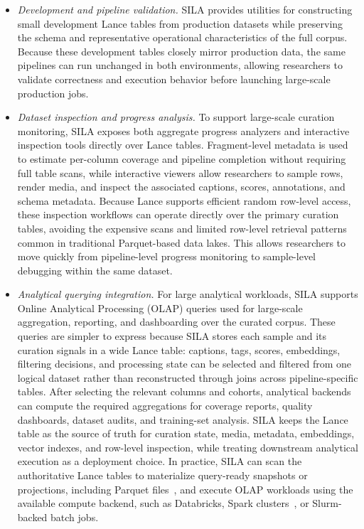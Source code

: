 \documentclass{llmxive}
\begin{document}
\begin{itemize}

\item \textit{Development and pipeline validation.}
SILA provides utilities for constructing small development Lance tables from production datasets while preserving the schema and representative operational characteristics of the full corpus. Because these development tables closely mirror production data, the same pipelines can run unchanged in both environments, allowing researchers to validate correctness and execution behavior before launching large-scale production jobs.

\item \textit{Dataset inspection and progress analysis.}
To support large-scale curation monitoring, SILA exposes both aggregate progress analyzers and interactive inspection tools directly over Lance tables. Fragment-level metadata is used to estimate per-column coverage and pipeline completion without requiring full table scans, while interactive viewers allow researchers to sample rows, render media, and inspect the associated captions, scores, annotations, and schema metadata. Because Lance supports efficient random row-level access, these inspection workflows can operate directly over the primary curation tables, avoiding the expensive scans and limited row-level retrieval patterns common in traditional Parquet-based data lakes. This allows researchers to move quickly from pipeline-level progress monitoring to sample-level debugging within the same dataset.

\item \textit{Analytical querying integration.}
For large analytical workloads, SILA supports Online Analytical Processing (OLAP) queries used for large-scale aggregation, reporting, and dashboarding over the curated corpus. These queries are simpler to express because SILA stores each sample and its curation signals in a wide Lance table: captions, tags, scores, embeddings, filtering decisions, and processing state can be selected and filtered from one logical dataset rather than reconstructed through joins across pipeline-specific tables. After selecting the relevant columns and cohorts, analytical backends can compute the required aggregations for coverage reports, quality dashboards, dataset audits, and training-set analysis. SILA keeps the Lance table as the source of truth for curation state, media, metadata, embeddings, vector indexes, and row-level inspection, while treating downstream analytical execution as a deployment choice. In practice, SILA can scan the authoritative Lance tables to materialize query-ready snapshots or projections, including Parquet files~\citep{parquet2013}, and execute OLAP workloads using the available compute backend, such as Databricks, Spark clusters~\citep{zaharia2016apache}, or Slurm-backed batch jobs.

\end{itemize}
\end{document}

